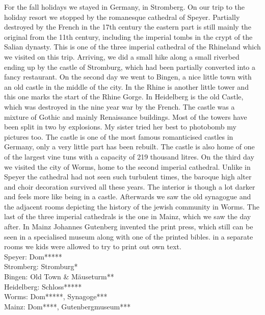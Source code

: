 For the fall holidays we stayed in Germany, in Stromberg. On our trip to the holiday resort we stopped by the romanesque cathedral of Speyer. Partially destroyed by the French in the 17th century the eastern part is still mainly the original from the 11th century, including the imperial tombs in the crypt of the Salian dynasty. This is one of the three imperial cathedral of the Rhineland which we visited on this trip. Arriving, we did a small hike along a small riverbed ending up by the castle of Stromburg, which had been partially converted into a fancy restaurant. On the second day we went to Bingen, a nice little town with an old castle in the middle of the city. In the Rhine is another little tower and this one marks the start of the Rhine Gorge. In Heidelberg is the old Castle, which was destroyed in the nine year war by the French. The castle was a mixture of Gothic and mainly Renaissance buildings. Most of the towers have been split in two by explosions. My sister tried her best to photobomb my pictures too. The castle is one of the most famous romanticised castles in Germany, only a very little part has been rebuilt. The castle is also home of one of the largest vine tuns with a capacity of 219 thousand litres. On the third day we visited the city of Worms, home to the second imperial cathedral. Unlike in Speyer the cathedral had not seen such turbulent times, the baroque high alter and choir decoration survived all these years. The interior is though a lot darker and feels more like being in a castle. Afterwards we saw the old synagogue and the adjacent rooms depicting the history of the jewish community in Worms. The last of the three imperial cathedrals is the one in Mainz, which we saw the day after. In Mainz Johannes Gutenberg invented the print press, which still can be seen in a specialised museum along with one of the printed bibles. in a separate rooms we kids were allowed to try to print out own text.\\ 

Speyer: Dom*****\\
Stromberg: Stromburg*\\
Bingen: Old Town \& M\"auseturm**\\
Heidelberg: Schloss*****\\
Worms: Dom*****, Synagoge***\\
Mainz: Dom****, Gutenbergmuseum***